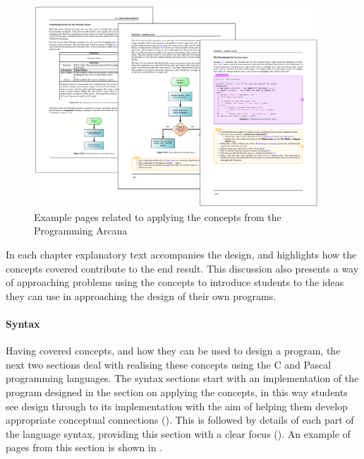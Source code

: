 \begin{figure}[h]
  \centering
  \includegraphics[width=0.95\textwidth]{ArcanaApplying}
  \caption{Example pages related to applying the concepts from the Programming Arcana}
  \label{fig:arcana_applying}
\end{figure}

In each chapter explanatory text accompanies the design, and highlights how the concepts covered contribute to the end result. This discussion also presents a way of approaching problems using the concepts to introduce students to the ideas they can use in approaching the design of their own programs.

\clearpage
\paragraph{Syntax} %
\label{par:syntax}

Having covered concepts, and how they can be used to design a program, the next two sections deal with realising these concepts using the C and Pascal programming languages. The syntax sections start with an implementation of the program designed in the section on applying the concepts, in this way students see design through to its implementation with the aim of helping them develop appropriate conceptual connections (). This is followed by details of each part of the language syntax, providing this section with a clear focus (). An example of pages from this section is shown in .

